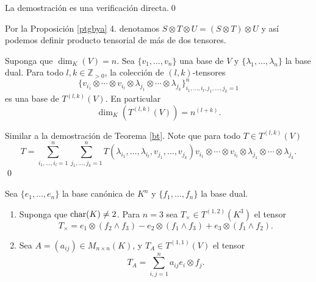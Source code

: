 \dem La demostraci\'on es una verificaci\'on directa.\qed

\begin{nota}
Por la Proposici\'on \ref{ptgbya} 4. denotamos $S\otimes T\otimes U= (S\otimes T)\otimes U$ y as\'i podemos definir producto tensorial de m\'as de dos tensores.
\end{nota}

\begin{teo}
Suponga que $\dim_K(V)=n$. Sea $\{v_1,\ldots,v_n\}$ una base de $V$ y $\{\lambda_1,\ldots,\lambda_n\}$ la base dual. Para todo $l,k\in\mathbb{Z}_{>0}$, la colecci\'on de $(l,k)$-tensores
$$\Big\{v_{i_1}\otimes\cdots\otimes v_{i_l}\otimes\lambda_{j_1}\otimes\cdots\otimes\lambda_{j_k}\Big\}_{i_1,\ldots,i_l,j_1,\ldots,j_k=1}^n$$
es una base de $T^{(l,k)}(V)$. En particular $$\dim_K\left(T^{(l,k)}(V)\right)=n^{(l+k)}.$$
\end{teo}

\dem Similar a la demostraci\'on de Teorema \ref{bt}. Note que para todo $T\in T^{(l,k)}(V)$
$$T=\sum_{i_1,\ldots,i_l=1}^n\sum_{j_1,\ldots,j_k=1}^nT(\lambda_{i_1},\ldots,\lambda_{i_l},v_{j_1},\ldots,v_{j_k})v_{i_1}\otimes\cdots\otimes v_{i_l}\otimes\lambda_{j_1}\otimes\cdots\otimes\lambda_{j_k}.$$\qed

\begin{ejem}\label{tlkej}
Sea $\{e_1,\ldots,e_n\}$ la base can\'onica de $K^n$ y $\{f_1,\ldots,f_n\}$ la base dual.
\begin{enumerate}
\item Suponga que $\operatorname{char}(K)\ne 2$. Para $n=3$ sea $T_{\times}\in T^{(1,2)}(K^3)$ el tensor
$$T_\times=e_1\otimes(f_2\wedge f_3)-e_2\otimes(f_1\wedge f_3)+e_3\otimes(f_1\wedge f_2).$$
\item Sea $A=(a_{ij})\in M_{n\times n}(K)$, y $T_A\in T^{(1,1)}(V)$ el tensor
$$T_A=\sum_{i,j=1}^n a_{ij}e_i\otimes f_j.$$ 
\end{enumerate}
\end{ejem}

